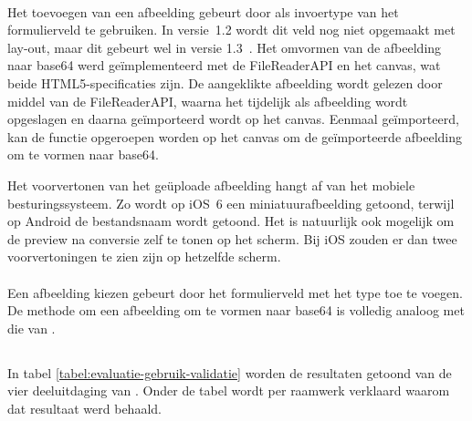 \paragraph{\jqm}
Het toevoegen van een afbeelding gebeurt door  als invoertype van het formulierveld te gebruiken. 
In versie~1.2 wordt dit veld nog niet opgemaakt met lay-out, maar dit gebeurt wel in versie 1.3~\cite{JQuery2013d}. 
Het omvormen van de afbeelding naar base64 werd geïmplementeerd met de FileReaderAPI en het canvas, wat beide HTML5-specificaties zijn. 
De aangeklikte afbeelding wordt gelezen door middel van de FileReaderAPI, waarna het tijdelijk als afbeelding wordt opgeslagen en daarna geïmporteerd wordt op het canvas. 
Eenmaal geïmporteerd, kan de functie  opgeroepen worden op het canvas om de geïmporteerde afbeelding om te vormen naar base64. 

Het voorvertonen van het geüploade afbeelding hangt af van het mobiele besturingssysteem.
Zo wordt op iOS~6 een miniatuurafbeelding getoond, terwijl op Android de bestandsnaam wordt getoond.
Het is natuurlijk ook mogelijk om de preview na conversie zelf te tonen op het scherm.
Bij iOS zouden er dan twee voorvertoningen te zien zijn op hetzelfde scherm.

\paragraph{\lungo}
Een afbeelding kiezen gebeurt door het formulierveld met het type  toe te voegen.
De methode om een afbeelding om te vormen naar base64 is volledig analoog met die van \jqm{}.


\subsection{}
\label{sec:evaluatie-gebruik-validatie}

In tabel \ref{tabel:evaluatie-gebruik-validatie} worden de resultaten getoond van de vier deeluitdaging van .
Onder de tabel wordt per raamwerk verklaard waarom dat resultaat werd behaald.


